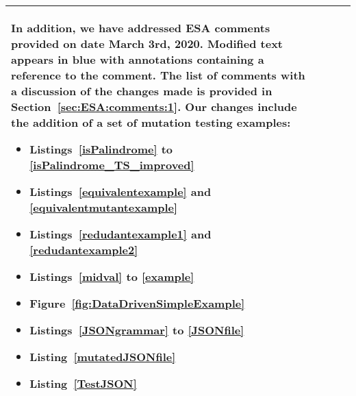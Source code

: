 \begin{longtable}{|p{2cm}|p{1cm}|p{1.5cm}|p{9cm}|@{}}
\begin{minipage}{8cm}
In addition, we have addressed ESA comments provided on date March 3rd, 2020. Modified text appears in blue with annotations containing a reference to the comment. The list of comments with a discussion of the changes made is provided in Section~\ref{sec:ESA:comments:1}. Our changes include the addition of a set of mutation testing examples:
\begin{itemize}
	\item Listings~\ref{isPalindrome} to \ref{isPalindrome_TS_improved}
	\item Listings~\ref{equivalentexample} and \ref{equivalentmutantexample}
	\item Listings~\ref{redudantexample1} and \ref{redudantexample2}	
	\item Listings~\ref{midval} to \ref{example}
	\item Figure~\ref{fig:DataDrivenSimpleExample}
	\item Listings~\ref{JSONgrammar} to \ref{JSONfile}
	\item Listing~\ref{mutatedJSONfile}
	\item Listing~\ref{TestJSON}
\end{itemize}

\end{minipage}


\\


\hline                                                           
\end{longtable}
\normalsize

\clearpage